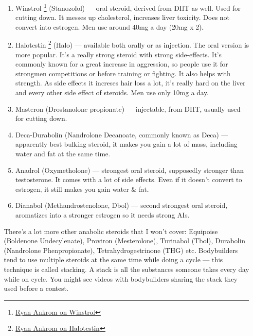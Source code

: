 \documentclass[openany, 12pt]{book}
\begin{document}
\begin{enumerate}
		\item Winstrol
                  \footnote{\href{https://www.youtube.com/watch?v=wH0A95aktLo}{Ryan Ankrom on Winstrol}}
                  (Stanozolol) --- oral steroid, derived from DHT as well. Used for cutting down. It messes up cholesterol, increases liver toxicity. Does not convert into estrogen.
                  Men use around 40mg a day (20mg x 2).

		\item Halotestin
                  \footnote{\href{https://www.youtube.com/watch?v=W8Gghg6vvuU}{Ryan Ankrom on Halotestin}}
                  (Halo) --- available both orally or as injection. The oral version is more popular. It's a really strong steroid with strong side-effects. It's commonly known for a great increase in
                  aggression, so people use it for strongmen competitions or before training or fighting. It also helps with strength. As side effects it increses hair loss a lot, it's really hard on the liver
                  and every other side effect of steroids. Men use only 10mg a day.

		\item Masteron (Drostanolone propionate) --- injectable, from DHT, usually used for cutting down.

		\item Deca-Durabolin (Nandrolone Decanoate, commonly known as Deca) --- apparently best bulking steroid, it makes you gain a lot of mass, including water and fat at the same time.

		\item Anadrol (Oxymetholone) --- strongest oral steroid, supposedly stronger than testosterone. It comes with a lot of side effects. Even if it doesn't convert to estrogen, it still
                  makes you gain water \& fat.
                  
		\item Dianabol (Methandrostenolone, Dbol) --- second strongest oral steroid, aromatizes into a stronger estrogen so it needs strong AIs.

	\end{enumerate}

        There's a lot more other anabolic steroids that I won't cover: Equipoise (Boldenone Undecylenate), Proviron (Mesterolone), Turinabol (Tbol), Durabolin (Nandrolone Phenpropionate),
        Tetrahydrogestrinone (THG) etc. Bodybuilders tend to use multiple steroids at the same time while doing a cycle --- this technique is called stacking.
        A stack is all the substances someone takes every day while on cycle. You might see videos with bodybuilders sharing the stack they used before a contest.
\end{document}

